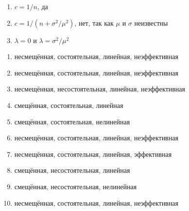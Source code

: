\begin{solution}{18.14}
\end{solution}
\begin{solution}{18.15}
\end{solution}
\begin{solution}{18.16}
\end{solution}
\begin{solution}{18.17}
\end{solution}
\begin{solution}{18.18}
\end{solution}
\begin{solution}{18.19}
\end{solution}
\begin{solution}{18.20}
\end{solution}
\begin{solution}{18.21}
\end{solution}
\begin{solution}{18.22}
\end{solution}
\begin{solution}{19.1}
    \begin{enumerate}
      \item $c=1/n$, да
      \item $c=1/(n+\sigma^2/\mu^2)$, нет, так как $\mu$ и $\sigma$ неизвестны
      \item $\lambda=0$ и $\lambda=\sigma^2/\mu^2$
    \end{enumerate}
  
\end{solution}
\begin{solution}{19.2}
    \begin{enumerate}
    \item несмещённая, состоятельная, линейная, неэффективная
    \item несмещённая, состоятельная, линейная, неэффективная
    \item несмещённая, несостоятельная, линейная, неэффективная
    \item смещённая, состоятельная, линейная
    \item смещённая, состоятельная, нелинейная
    \item несмещённая, состоятельная, линейная, неэффективная
    \item несмещённая, состоятельная, линейная, эффективная
    \item смещённая, несостоятельная, линейная
    \item смещённая, несостоятельная, нелинейная
    \item несмещённая, состоятельная, линейная, неэффективная
    \end{enumerate}
  
\end{solution}
